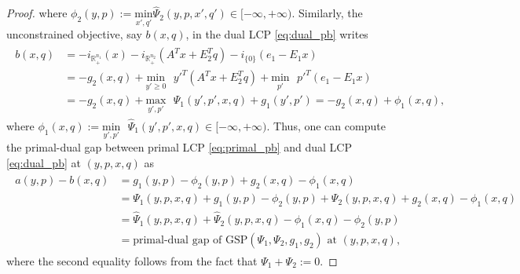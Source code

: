 \documentclass{article} %
\begin{document}
\begin{proof}
where $\phi_2(y, p) := \underset{x',q'}{\text{min}}\text{
}\hat{\Psi}_2(y, p, x', q') \in [-\infty, +\infty)$.
Similarly, the unconstrained objective, say
$b(x, q)$, in the dual LCP \eqref{eq:dual_pb} writes
\begin{eqnarray*}
  \begin{aligned}
 b(x, q) &= 
 -i_{\mathbb{R}^{n_1}_+}(x) - i_{\mathbb{R}^{n_2}_+}(A^Tx+E_2^Tq) -
 i_{\{0\}}(e_1 - E_1x)\\
    &= -g_2(x, q) + \underset{y' \geq
   0}{\text{min}}\text{ }y'^T(A^Tx + E_2^Tq) +
 \underset{p'}{\text{min}}\text{ }p'^T(e_1-E_1x)\\
    &= -g_2(x, q)
 +\underset{y',p'}{\text{max}}\text{ }\Psi_1(y', p', x, q) +
 g_1(y', p') = -g_2(x, q) + \phi_1(x, q),
   \end{aligned}
\end{eqnarray*}
where $\phi_1(x, q) :=
\underset{y',p'}{\text{min}}\text{ }\hat{\Psi}_1(y', p', x, q) \in
         [-\infty, +\infty)$.
Thus, one can compute the primal-dual gap between primal LCP
\eqref{eq:primal_pb} and dual LCP \eqref{eq:dual_pb} at $(y, p, x, q)$ as
\begin{eqnarray*}
  \begin{split}
  a(y, p) - b(x, q) &= g_1(y, p) - \phi_2(y, p) + g_2(x, q) - \phi_1(x,
  q) \\
  &= \Psi_1(y, p, x, q) +  g_1(y, p) - \phi_2(y, p) + \Psi_2(y, p, x,
  q) + g_2(x, q) - \phi_1(x, q)\\
  &= \hat{\Psi}_1(y, p, x, q) + \hat{\Psi}_2(y, p, x, q) - \phi_1(x,
  q) - \phi_2(y, p)\\
  &= \text{primal-dual gap of GSP}(\Psi_1, \Psi_2,
  g_1, g_2) \text{ at }(y, p, x, q),
  \end{split}
\end{eqnarray*}
where the second equality follows from the fact that $\Psi_1 + \Psi_2
:= 0$.



\end{proof}
\end{document}

